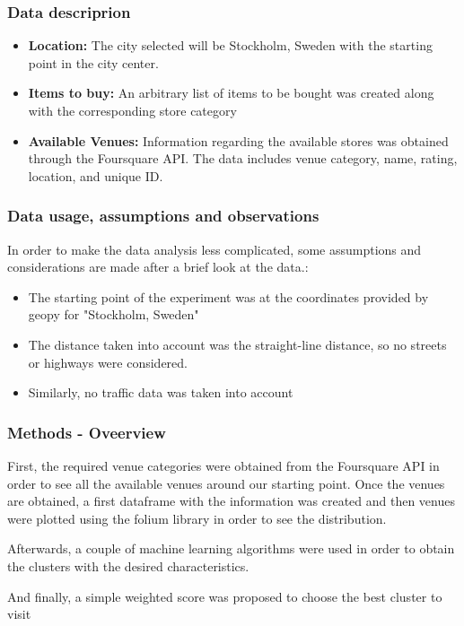 \documentclass{article}
\begin{document}
		\subsubsection{Data descriprion}
		\begin{itemize}
			\item \textbf{Location:} The city selected will be Stockholm, Sweden with the starting point in the city center.
			\item \textbf{Items to buy:} An arbitrary list of items to be bought was created along with the corresponding store category
			\item \textbf{Available Venues:} Information regarding the available stores was obtained through the Foursquare API. The data includes venue category, name, rating, location, and unique ID.				
		\end{itemize}
		\subsubsection{Data usage, assumptions and observations}
			In order to make the data analysis less complicated, some assumptions and considerations are made after a brief look at the data.:
			\begin{itemize}
				\item The starting point of the experiment was at the coordinates provided by geopy for "Stockholm, Sweden"
				\item The distance taken into account was the straight-line distance, so no streets or highways were considered.
				\item Similarly, no traffic data was taken into account			
			\end{itemize} 	
		\newpage
		\subsubsection{Methods - Oveerview}
			First, the required venue categories were obtained from the Foursquare API in order to see all the available venues around our starting point. Once the venues are obtained, a first dataframe with the information was created and then venues were plotted using the folium library in order to see the distribution. 
			
			Afterwards, a couple of machine learning algorithms were used in order to obtain the clusters with the desired characteristics. 
			
			And finally, a simple weighted score was proposed to choose the best cluster to visit
			
\end{document}
